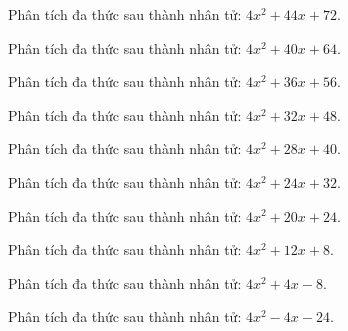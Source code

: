 \begin{bt}
	Phân tích đa thức sau thành nhân tử: $4 x^2 + 44 x + 72$.
\end{bt}
\begin{bt}
	Phân tích đa thức sau thành nhân tử: $4 x^2 + 40 x + 64$.
\end{bt}
\begin{bt}
	Phân tích đa thức sau thành nhân tử: $4 x^2 + 36 x + 56$.
\end{bt}
\begin{bt}
	Phân tích đa thức sau thành nhân tử: $4 x^2 + 32 x + 48$.
\end{bt}
\begin{bt}
	Phân tích đa thức sau thành nhân tử: $4 x^2 + 28 x + 40$.
\end{bt}
\begin{bt}
	Phân tích đa thức sau thành nhân tử: $4 x^2 + 24 x + 32$.
\end{bt}
\begin{bt}
	Phân tích đa thức sau thành nhân tử: $4 x^2 + 20 x + 24$.
\end{bt}
\begin{bt}
	Phân tích đa thức sau thành nhân tử: $4 x^2 + 12 x + 8$.
\end{bt}
\begin{bt}
	Phân tích đa thức sau thành nhân tử: $4 x^2 + 4 x - 8$.
\end{bt}
\begin{bt}
	Phân tích đa thức sau thành nhân tử: $4 x^2 - 4 x - 24$.
\end{bt}
